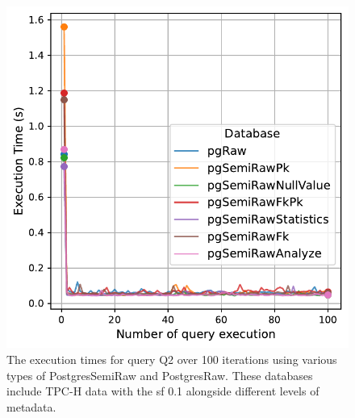 \begin{figure}[hbt!]
\centering
\includegraphics[width=1.0\linewidth]{charts-eval-exp-time/execution_time_db_type_Q2.pdf}
\caption[Q2:result]{The execution times for query Q2 over 100 iterations using various types of PostgresSemiRaw and PostgresRaw. These databases include TPC-H data with the \acrshort{sf} 0.1 alongside different levels of metadata.}
\label{fig:execution_time_db_type_Q2}
\end{figure}
